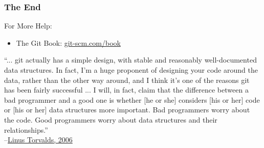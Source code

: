 \begin{frame}[fragile]
\frametitle{The End}

For More Help:
\begin{itemize}
\item The Git Book: \href{https://git-scm.com/book}{git-scm.com/book}
\end{itemize}
\vspace{50px}
{\tiny ``... git actually has a simple design, with stable and reasonably well-documented data structures.
In fact, I'm a huge proponent of designing your code around the data, rather than the other
way around, and I think it's one of the reasons git has been fairly successful ... I will, in
fact, claim that the difference between a bad programmer and a good one is whether [he or she]
considers [his or her] code or [his or her] data structures more important. Bad programmers worry
about the code. Good programmers worry about data structures and their relationships.''\\
--\href{http://lwn.net/Articles/193245/}{Linus Torvalds, 2006}
}
\end{frame}


